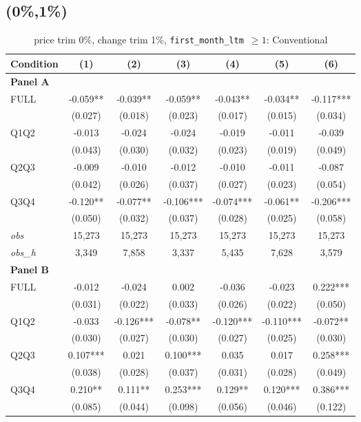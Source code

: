 \subsection{(0\%,1\%)}
\begin{table}[!htbp]
\centering
\caption{price trim 0\%, change trim 1\%, \texttt{first\_month\_ltm $\geq 1$}: Conventional}
\label{tab:abc:trim01:ltm1:conventional:bal}
\small
\begin{tabular}{lcccccc}
\toprule
Condition & (1) & (2) & (3) & (4) & (5) & (6) \\
\midrule
\textbf{Panel A} &&&&&&  \\

FULL & -0.059** & -0.039** & -0.059** & -0.043** & -0.034** & -0.117*** \\
 & (0.027) & (0.018) & (0.023) & (0.017) & (0.015) & (0.034) \\
Q1Q2 & -0.013 & -0.024 & -0.024 & -0.019 & -0.011 & -0.039 \\
 & (0.043) & (0.030) & (0.032) & (0.023) & (0.019) & (0.049) \\
Q2Q3 & -0.009 & -0.010 & -0.012 & -0.010 & -0.011 & -0.087 \\
 & (0.042) & (0.026) & (0.037) & (0.027) & (0.023) & (0.054) \\
Q3Q4 & -0.120** & -0.077** & -0.106*** & -0.074*** & -0.061** & -0.206*** \\
 & (0.050) & (0.032) & (0.037) & (0.028) & (0.025) & (0.058) \\

\textit{obs} & 15,273 & 15,273 & 15,273 & 15,273 & 15,273 & 15,273 \\
\textit{obs\_h} & 3,349 & 7,858 & 3,337 & 5,435 & 7,628 & 3,579 \\

\textbf{Panel B} &&&&&&  \\

FULL & -0.012 & -0.024 & 0.002 & -0.036 & -0.023 & 0.222*** \\
 & (0.031) & (0.022) & (0.033) & (0.026) & (0.022) & (0.050) \\
Q1Q2 & -0.033 & -0.126*** & -0.078** & -0.120*** & -0.110*** & -0.072** \\
 & (0.030) & (0.027) & (0.030) & (0.027) & (0.025) & (0.030) \\
Q2Q3 & 0.107*** & 0.021 & 0.100*** & 0.035 & 0.017 & 0.258*** \\
 & (0.038) & (0.028) & (0.037) & (0.031) & (0.028) & (0.049) \\
Q3Q4 & 0.210** & 0.111** & 0.253*** & 0.129** & 0.120*** & 0.386*** \\
 & (0.085) & (0.044) & (0.098) & (0.056) & (0.046) & (0.122) \\


\end{tabular}
\end{table}
